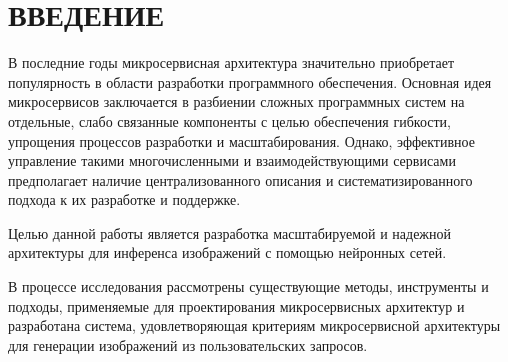\chapter*{\large ВВЕДЕНИЕ}  
В последние годы микросервисная архитектура значительно приобретает популярность в области разработки программного обеспечения. Основная идея микросервисов заключается в разбиении сложных программных систем на отдельные, слабо связанные компоненты с целью обеспечения гибкости, упрощения процессов разработки и масштабирования. Однако, эффективное управление такими многочисленными и взаимодействующими сервисами предполагает наличие централизованного описания и систематизированного подхода к их разработке и поддержке.

Целью данной работы является разработка масштабируемой и надежной 
архитектуры для инференса изображений с помощью нейронных сетей.

В процессе исследования рассмотрены существующие методы, инструменты и подходы, применяемые для проектирования микросервисных архитектур и разработана система, удовлетворяющая критериям микросервисной
архитектуры для генерации изображений из пользовательских запросов.

